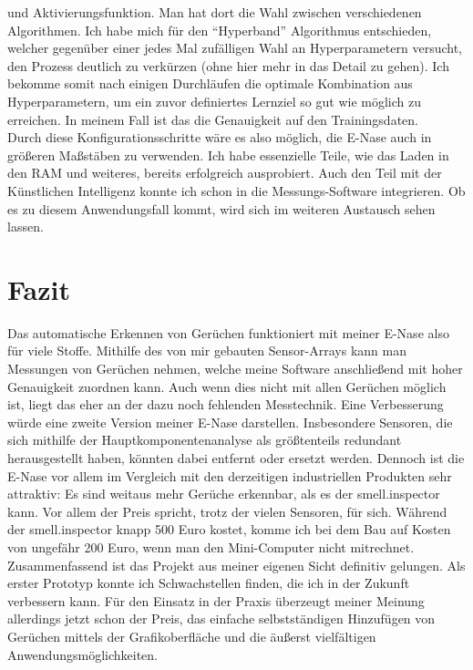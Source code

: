 \documentclass[10pt]{article}
\begin{document}
und Aktivierungsfunktion. Man hat dort die Wahl zwischen verschiedenen Algorithmen. Ich habe mich für den "`Hyperband"' \autocite{Hyperband} Algorithmus entschieden, welcher gegenüber
einer jedes Mal zufälligen Wahl an Hyperparametern versucht, den Prozess deutlich zu verkürzen (ohne hier mehr in das Detail zu gehen). Ich bekomme somit nach einigen Durchläufen die optimale
Kombination aus Hyperparametern, um ein zuvor definiertes Lernziel so gut wie möglich zu erreichen. In meinem Fall ist das die Genauigkeit auf den Trainingsdaten.\\
Durch diese Konfigurationsschritte wäre es also möglich, die E-Nase auch in größeren Maßstäben zu verwenden. Ich habe essenzielle Teile, wie das Laden in den RAM
und weiteres, bereits erfolgreich ausprobiert. Auch den Teil mit der Künstlichen Intelligenz konnte ich schon in die Messungs-Software integrieren. Ob es zu diesem Anwendungsfall kommt,
wird sich im weiteren Austausch sehen lassen.

\section{Fazit}
Das automatische Erkennen von Gerüchen funktioniert mit meiner E-Nase also für viele Stoffe. Mithilfe des von mir gebauten Sensor-Arrays
kann man Messungen von Gerüchen nehmen, welche meine Software anschließend mit hoher Genauigkeit zuordnen kann. Auch wenn dies nicht mit allen Gerüchen möglich ist, 
liegt das eher an der dazu noch fehlenden Messtechnik. Eine Verbesserung würde eine zweite Version meiner E-Nase darstellen. Insbesondere Sensoren, die sich mithilfe 
der Hauptkomponentenanalyse als größtenteils redundant herausgestellt haben, könnten dabei entfernt oder ersetzt werden. 
Dennoch ist die E-Nase vor allem im Vergleich mit den derzeitigen industriellen Produkten sehr attraktiv:
Es sind weitaus mehr Gerüche erkennbar, als es der smell.inspector kann. Vor allem der Preis spricht, trotz der vielen Sensoren, für sich. Während der 
smell.inspector knapp 500 Euro kostet, komme ich bei dem Bau auf Kosten von ungefähr 200 Euro, wenn man den Mini-Computer nicht mitrechnet.\\
Zusammenfassend ist das Projekt aus meiner eigenen Sicht definitiv gelungen. Als erster Prototyp konnte 
ich Schwachstellen finden, die ich in der Zukunft verbessern kann. Für den Einsatz in der Praxis überzeugt meiner Meinung allerdings jetzt schon der Preis, das einfache 
selbstständigen Hinzufügen von Gerüchen mittels der Grafikoberfläche und die äußerst vielfältigen Anwendungsmöglichkeiten.
\end{document}
